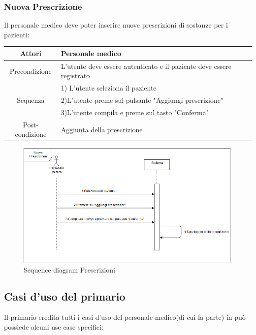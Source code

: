 \documentclass[a4paper]{report}
\begin{document}
            \subsubsection{Nuova Prescrizione}
                Il personale medico deve poter inserire nuove prescrizioni di sostanze per i pazienti:
                 \begin{table}[htbp]
                    \begin{tabular}{|c|l|}
                        \hline
                        Attori & Personale medico \\\hline
                    Precondizione & L'utente deve essere autenticato e il paziente deve essere registrato \\\hline
                     & 1) L'utente seleziona il paziente \\
                    Sequenza & 2)L'utente preme sul pulsante "Aggiungi prescrizione" \\
                      & 3)L'utente compila e preme sul tasto "Conferma" \\\hline
                    Post-condizione & Aggiunta della prescrizione \\\hline
                    \end{tabular}
                \end{table}
                \begin{figure}[htbp]
                    \centering
                     \includegraphics[scale=0.4]{InsPres.png}
                        \caption{Sequence diagram Prescrizioni}
                \end{figure}
                
        \newpage
        \subsection{Casi d'uso del primario}
            Il primario eredita tutti i casi d'uso del personale medico(di cui fa parte) in può possiede alcuni use case specifici:
\end{document}
